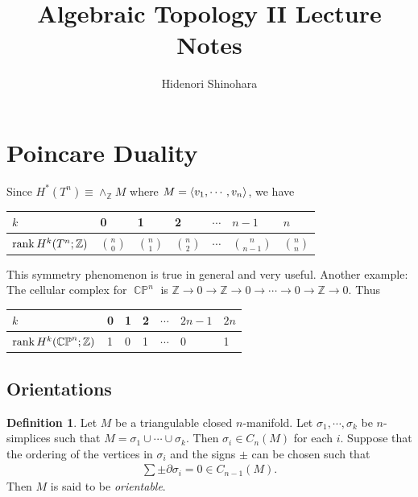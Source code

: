 \documentclass[psamsfonts]{amsart}
\theoremstyle{definition}
\newtheorem{defn}[thm]{Definition}
\theoremstyle{remar}
\DeclareMathOperator{\CP}{\mathbb{C}\mathbb{P}}
\numberwithin{equation}{section}
\begin{document}
\title{Algebraic Topology II Lecture Notes}
\author{Hidenori Shinohara}

\maketitle
\tableofcontents

\section{Poincare Duality}

Since $H^{\ast}(T^n) \equiv \wedge_{\mathbb{Z}} M$ where $M = \ev{ v_1, \cdots, v_n }$, we have

\begin{center}
  \begin{tabular}{| l | l | l | l | l | l | l |} \hline
    $k$                          & 0 & 1 & 2 & $\cdots$ & $n - 1$  & $n$ \\ \hline
    $\rank H^k(T^n; \mathbb{Z})$ & $\binom{n}{0}$ & $\binom{n}{1}$ & $\binom{n}{2}$ & $\cdots$ & $\binom{n}{n - 1}$ & $\binom{n}{n}$ \\ \hline
  \end{tabular}
\end{center}

This symmetry phenomenon is true in general and very useful.
Another example: The cellular complex for $\CP^n$ is $\mathbb{Z} \rightarrow 0 \rightarrow \mathbb{Z} \rightarrow 0 \rightarrow \cdots \rightarrow 0 \rightarrow \mathbb{Z} \rightarrow 0$.
Thus

\begin{center}
  \begin{tabular}{| l | l | l | l | l | l | l |} \hline
    $k$                          & 0 & 1 & 2 & $\cdots$ & $2n - 1$  & $2n$ \\ \hline
    $\rank H^k(\CP^n; \mathbb{Z})$ & 1 & 0 & 1 & $\cdots$ & 0         & 1 \\
    \hline
  \end{tabular}
\end{center}

\subsection{Orientations}

\begin{defn}
  Let $M$ be a triangulable closed $n$-manifold.
  Let $\sigma_1, \cdots, \sigma_k$ be $n$-simplices such that $M = \sigma_1 \cup \cdots \cup \sigma_k$.
  Then $\sigma_i \in C_n(M)$ for each $i$.
  Suppose that the ordering of the vertices in $\sigma_i$ and the signs $\pm$ can be chosen such that
  \begin{align*}
    \sum \pm \partial \sigma_i = 0 \in C_{n - 1}(M).
  \end{align*}
  Then $M$ is said to be \textit{orientable}.
\end{defn}
\end{document}
